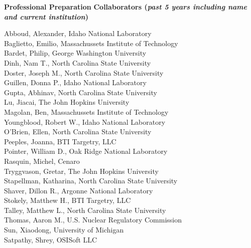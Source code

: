 \documentclass[11pt,letterpaper,english]{article}
\begin{document}
\begin{flushleft} {\bf Professional Preparation}
\vspace{-6pt}
{\bf Collaborators ({\emph{past 5 years including name and current institution}})}
{\parindent 16pt


Abboud, Alexander,	Idaho National Laboratory \\
Baglietto, Emilio,	Massachussets Institute of Technology \\
Bardet, Philip,	George Washington University \\
Dinh, Nam T.,	North Carolina State University \\
Doster, Joseph M.,	North Carolina State University \\
Guillen, Donna P.,	Idaho National Laboratory \\
Gupta, Abhinav,	North Carolina State University \\
Lu, Jiacai,	The John Hopkins University \\
Magolan, Ben,	Massachussets Institute of Technology \\
Youngblood, Robert W.,	Idaho National Laboratory \\
O'Brien, Ellen,	North Carolina State University \\
Peeples, Joanna,	BTI Targetry, LLC \\
Pointer, William D.,	Oak Ridge National Laboratory \\
Rasquin, Michel,	Cenaro \\
Tryggvason, Gretar,	The John Hopkins University \\
Stapellman, Katharina,	North Carolina State University \\
Shaver, Dillon R.,	Argonne National Laboratory \\
Stokely, Matthew H.,	BTI Targetry, LLC \\
Talley, Matthew L.,	North Carolina State University \\
Thomas, Aaron M.,	U.S. Nuclear Regulatory Commission \\
Sun, Xiaodong,	University of Michigan \\
Satpathy, Shrey,	OSISoft LLC

}


\end{flushleft}
\end{document}
